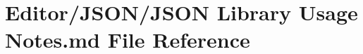 \hypertarget{_j_s_o_n_01_library_01_usage_01_notes_8md}{\section{Editor/\+J\+S\+O\+N/\+J\+S\+O\+N Library Usage Notes.\+md File Reference}
\label{_j_s_o_n_01_library_01_usage_01_notes_8md}
}
